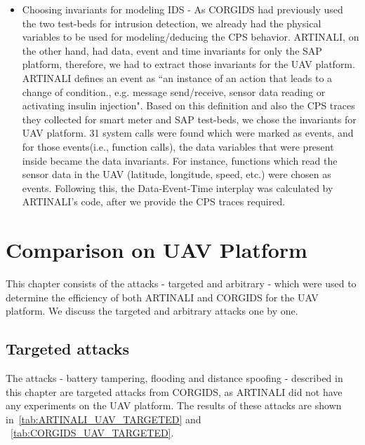 \begin{itemize}
\item Choosing invariants for modeling \ac{IDS} - As \ac{CORGIDS} had previously used the two test-beds for intrusion detection, we already had the physical variables to be used for modeling/deducing the \ac{CPS} behavior. ARTINALI, on the other hand, had data, event and time invariants for only the \ac{SAP} platform, therefore, we had to extract those invariants for the \ac{UAV} platform. ARTINALI defines an event as ``an instance of an action that leads to a change of condition., e.g. message send/receive, sensor data reading or activating insulin injection". Based on this definition and also the \ac{CPS} traces they collected for smart meter and \ac{SAP} test-beds, we chose the invariants for \ac{UAV} platform. 31 system calls were found which were marked as events, and for those events(i.e., function calls), the data variables that were present inside became the data invariants. For instance, functions which read the sensor data in the \ac{UAV} (latitude, longitude, speed, etc.) were chosen as events. Following this, the Data-Event-Time interplay was calculated by ARTINALI's code\cite{ARTINALI}, after we provide the \ac{CPS} traces required.
\end{itemize}

\section{Comparison on \ac{UAV} Platform}
This chapter consists of the attacks - targeted and arbitrary - which were used to determine the efficiency of both ARTINALI and \ac{CORGIDS} for the \ac{UAV} platform. We discuss the targeted and arbitrary attacks one by one.


\subsection{Targeted attacks}
The attacks - battery tampering, flooding and distance spoofing - described in this chapter are targeted attacks from \ac{CORGIDS}, as ARTINALI did not have any experiments on the \ac{UAV} platform.
The results of these attacks are shown in~\autoref{tab:ARTINALI_UAV_TARGETED} and ~\autoref{tab:CORGIDS_UAV_TARGETED}.

\begin{table}
\centering
  \caption{Results of intrusion detection by ARTINALI for Targeted attacks on \ac{UAV} platform}
  \label{tab:ARTINALI_UAV_TARGETED}
\end{table}

